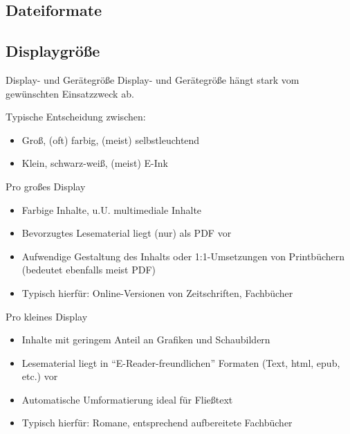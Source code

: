 \documentclass[hyperref={pdfpagelabels=false}]{beamer}
\begin{document}



\subsection{Dateiformate}




\subsection{Displaygröße}

\begin{frame}{Display- und Gerätegröße}
	Display- und Gerätegröße hängt stark vom gewünschten Einsatzzweck ab.

	Typische Entscheidung zwischen:

	\begin{itemize}
		\item Groß, (oft) farbig, (meist) selbstleuchtend
		\item Klein, schwarz-weiß, (meist) E-Ink
	\end{itemize}
\end{frame}

\begin{frame}{Pro großes Display}
	\begin{itemize}
		\item Farbige Inhalte, u.U. multimediale Inhalte
		\item Bevorzugtes Lesematerial liegt (nur) als PDF vor
		\item Aufwendige Gestaltung des Inhalts oder 1:1-Umsetzungen von Printbüchern (bedeutet ebenfalls meist PDF)
		\item Typisch hierfür: Online-Versionen von Zeitschriften, Fachbücher
	\end{itemize}
\end{frame}

\begin{frame}{Pro kleines Display}
	\begin{itemize}
		\item Inhalte mit geringem Anteil an Grafiken und Schaubildern
		\item Lesematerial liegt in "`E-Reader-freundlichen"' Formaten (Text, html, epub, etc.) vor
		\item Automatische Umformatierung ideal für Fließtext
		\item Typisch hierfür: Romane, entsprechend aufbereitete Fachbücher
	\end{itemize}
\end{frame}
\end{document}
